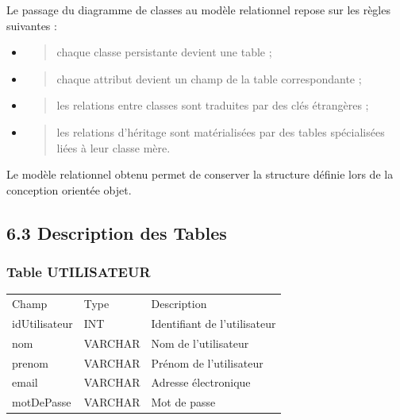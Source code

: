 \documentclass[
]{article}
\begin{document}
Le passage du diagramme de classes au modèle relationnel repose sur les
règles suivantes :

\begin{itemize}
\item
  \begin{quote}
  chaque classe persistante devient une table ;
  \end{quote}
\item
  \begin{quote}
  chaque attribut devient un champ de la table correspondante ;
  \end{quote}
\item
  \begin{quote}
  les relations entre classes sont traduites par des clés étrangères ;
  \end{quote}
\item
  \begin{quote}
  les relations d'héritage sont matérialisées par des tables
  spécialisées liées à leur classe mère.
  \end{quote}
\end{itemize}

Le modèle relationnel obtenu permet de conserver la structure définie
lors de la conception orientée objet.

\hypertarget{description-des-tables}{%
\subsection{6.3 Description des Tables}\label{description-des-tables}}

\hypertarget{table-utilisateur}{%
\subsubsection{Table UTILISATEUR}\label{table-utilisateur}}

\begin{longtable}[]{@{}lll@{}}
\toprule
\endhead
Champ & Type & Description \\
idUtilisateur & INT & Identifiant de l'utilisateur \\
nom & VARCHAR & Nom de l'utilisateur \\
prenom & VARCHAR & Prénom de l'utilisateur \\
email & VARCHAR & Adresse électronique \\
motDePasse & VARCHAR & Mot de passe \\
\bottomrule
\end{longtable}
\end{document}
